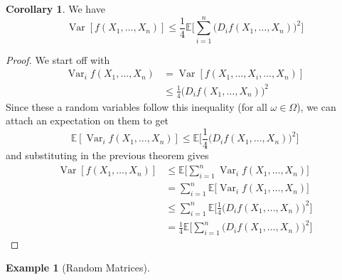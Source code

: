 \documentclass{article}
\DeclareMathOperator{\Var}{Var}
\theoremstyle{definition}
\newtheorem{example}{Example}[section]
\newtheorem{corollary}{Corollary}[theorem]
\theoremstyle{remark}
\theoremstyle{definition}
\begin{document}
\begin{corollary}
We have 
\[\Var[ f(X_1, \ldots, X_n)] \leq \frac{1}{4} \mathbb{E} \bigg[ \sum_{i=1}^n \big( D_i f(X_1, \ldots, X_n) \big)^2 \bigg] \]
\end{corollary}
\begin{proof}
We start off with 
\begin{align*}
    \Var_i f (X_1, \ldots, X_n) & = \Var[ f(X_1, \ldots, X_i, \ldots, X_n)] \\
    & \leq \frac{1}{4} \big( D_i f (X_1, \ldots, X_n)\big)^2 
\end{align*}
Since these a random variables follow this inequality (for all $\omega \in \Omega$), we can attach an expectation on them to get 
\[\mathbb{E}[\Var_i f (X_1, \ldots, X_n)] \leq \mathbb{E} \bigg[ \frac{1}{4} \big( D_i f (X_1, \ldots, X_n)\big)^2\bigg] \]
and substituting in the previous theorem gives 
\begin{align*}
    \Var[f(X_1, \ldots, X_n)] & \leq \mathbb{E} \bigg[ \sum_{i=1}^n \Var_i f(X_1, \ldots, X_n) \bigg] \\
    & = \sum_{i=1}^n \mathbb{E}\big[ \Var_i f(X_1, \ldots, X_n) \big] \\
    & \leq \sum_{i=1}^n \mathbb{E} \bigg[ \frac{1}{4} \big( D_i f (X_1, \ldots, X_n)\big)^2\bigg] \\
    & = \frac{1}{4} \mathbb{E} \bigg[ \sum_{i=1}^n \big( D_i f(X_1, \ldots, X_n) \big)^2 \bigg] 
\end{align*}
\end{proof}

\begin{example}[Random Matrices]

\end{example}
\end{document}
